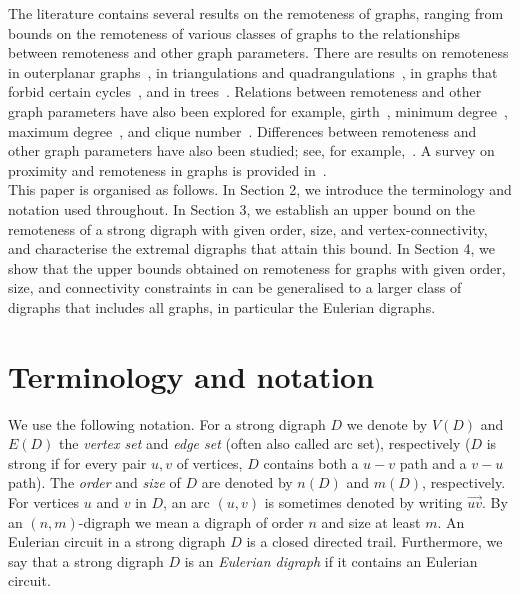 \documentclass[a4paper,11pt]{article}
\begin{document}
The literature contains several results on the remoteness of graphs, ranging from bounds 
on the remoteness of various classes of graphs to the relationships between remoteness and other 
graph parameters. There are results on remoteness in outerplanar graphs~\cite{DanMafMal20251}, 
in triangulations and quadrangulations~\cite{CzaDanOlsSze2021, DanMafMal20252}, in graphs that forbid certain cycles~\cite{DanJonMaf2021}, and in trees~\cite{BarEntSze1997, Zel1968}. 
Relations between remoteness and other graph parameters have also been explored for example, 
girth~\cite{AouHan2017}, minimum degree~\cite{Dan2015}, maximum degree~\cite{DanMafMal2022}, 
and clique number~\cite{HuaDas2014}. Differences between remoteness and other graph parameters 
have also been studied; see, for example,~\cite{AouHan2011, Dan2016, DanMaf2022, DanMafMal20252}. A survey on proximity and remoteness in graphs is provided in~\cite{Aou2024}. \\

This paper is organised as follows. In Section 2, we introduce the terminology and notation used throughout. In Section 3, we establish an upper bound on the remoteness of a strong digraph with given order, size, and vertex-connectivity, and characterise the extremal digraphs that attain this bound. In Section 4, we show that the upper bounds obtained on remoteness for graphs with given order, size, and connectivity constraints in \cite{DanMafMal2025} can be generalised to a larger class of digraphs that includes all graphs, in particular the Eulerian digraphs.





\section{Terminology and notation}
We use the following notation. For a strong digraph $D$ we denote by $V(D)$ and $E(D)$ the {\em vertex set} and {\em edge set} (often also called arc set), respectively ($D$ is strong if for every pair $u,v$ of vertices, $D$ contains both a $u-v$ path and a $v-u$ path). The {\em order} and {\em size} of $D$ are denoted by $n(D)$ and $m(D)$, respectively. For vertices $u$ and $v$ in $D$, an arc $(u,v)$ is sometimes denoted by writing $\overrightarrow{uv}$. By an $(n,m)$-digraph we mean a digraph of order $n$ and size at least $m$. An Eulerian circuit in a strong digraph $D$ is a closed directed trail. Furthermore, we say that a strong digraph $D$ is an {\em Eulerian digraph} if it contains an Eulerian circuit.\\
\end{document}

